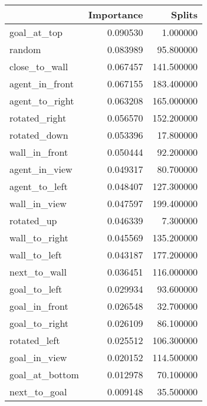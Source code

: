 \begin{tabular}{lrr}
\toprule
 & Importance & Splits \\
\midrule
goal\_at\_top & 0.090530 & 1.000000 \\
random & 0.083989 & 95.800000 \\
close\_to\_wall & 0.067457 & 141.500000 \\
agent\_in\_front & 0.067155 & 183.400000 \\
agent\_to\_right & 0.063208 & 165.000000 \\
rotated\_right & 0.056570 & 152.200000 \\
rotated\_down & 0.053396 & 17.800000 \\
wall\_in\_front & 0.050444 & 92.200000 \\
agent\_in\_view & 0.049317 & 80.700000 \\
agent\_to\_left & 0.048407 & 127.300000 \\
wall\_in\_view & 0.047597 & 199.400000 \\
rotated\_up & 0.046339 & 7.300000 \\
wall\_to\_right & 0.045569 & 135.200000 \\
wall\_to\_left & 0.043187 & 177.200000 \\
next\_to\_wall & 0.036451 & 116.000000 \\
goal\_to\_left & 0.029934 & 93.600000 \\
goal\_in\_front & 0.026548 & 32.700000 \\
goal\_to\_right & 0.026109 & 86.100000 \\
rotated\_left & 0.025512 & 106.300000 \\
goal\_in\_view & 0.020152 & 114.500000 \\
goal\_at\_bottom & 0.012978 & 70.100000 \\
next\_to\_goal & 0.009148 & 35.500000 \\
\bottomrule
\end{tabular}